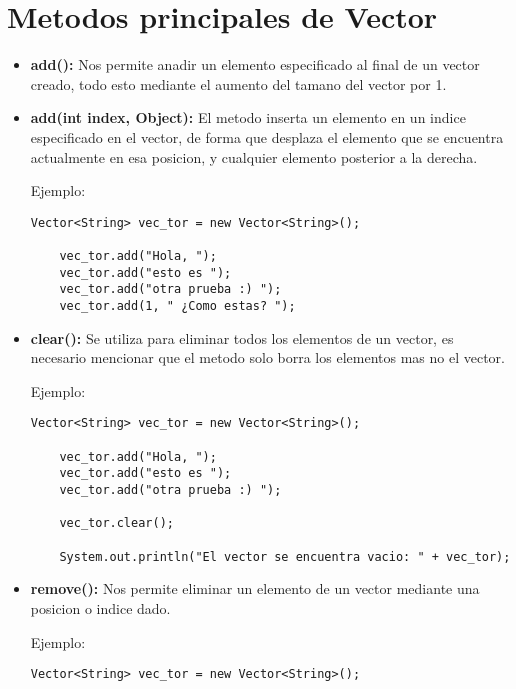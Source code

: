 \documentclass[12pt, letterpaper]{article} %
\begin{document}
\section*{Metodos principales de Vector}
\begin{itemize}
    \item \textbf{add():} Nos permite anadir un elemento especificado al final de un vector creado, todo esto mediante el aumento del tamano del vector por 1.

    \item \textbf{add(int index, Object):} El metodo inserta un elemento en un indice especificado en el vector, de forma que desplaza el elemento que se encuentra actualmente en esa posicion, y cualquier elemento posterior a la derecha.

    Ejemplo:
    \lstset{language = Java, breaklines=true, basicstyle=\footnotesize}
    \begin{lstlisting}[frame=single]
    Vector<String> vec_tor = new Vector<String>();

    vec_tor.add("Hola, ");
    vec_tor.add("esto es ");
    vec_tor.add("otra prueba :) ");
    vec_tor.add(1, " ¿Como estas? ");
    \end{lstlisting}

    \item \textbf{clear():} Se utiliza para eliminar todos los elementos de un vector, es necesario mencionar que el metodo solo borra los elementos mas no el vector.

    Ejemplo:
    \lstset{language = Java, breaklines=true, basicstyle=\footnotesize}
    \begin{lstlisting}[frame=single]
    Vector<String> vec_tor = new Vector<String>();

    vec_tor.add("Hola, ");
    vec_tor.add("esto es ");
    vec_tor.add("otra prueba :) ");

    vec_tor.clear();

    System.out.println("El vector se encuentra vacio: " + vec_tor);
    \end{lstlisting}

    \item \textbf{remove():} Nos permite eliminar un elemento de un vector mediante una posicion o indice dado.

    Ejemplo:
    \lstset{language = Java, breaklines=true, basicstyle=\footnotesize}
    \begin{lstlisting}[frame=single]
    Vector<String> vec_tor = new Vector<String>();


\end{lstlisting}
\end{itemize}
\end{document}
